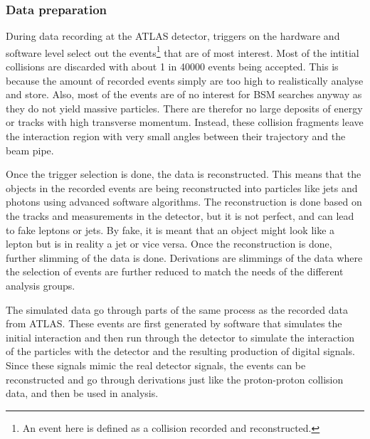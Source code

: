 \subsubsection*{Data preparation}
During data recording at the ATLAS detector, triggers on the hardware and software level select out the 
events\footnote{An event here is defined as a collision recorded and reconstructed.} that are of 
most interest. Most of the intitial collisions are discarded with about 1 in 40000 events being 
accepted. This is because the amount of recorded events simply are too 
 high to realistically analyse and store. Also, most of the events are of no interest for BSM 
 searches anyway as they do not yield massive particles. There are therefor no large deposits 
 of energy or tracks with high transverse momentum. Instead, these collision fragments leave 
 the interaction region with very small angles between their trajectory and the beam pipe. \par
 Once the trigger selection is done, the data is reconstructed. This means that the objects in 
 the recorded events are being reconstructed into particles like jets and photons using advanced 
 software algorithms. The reconstruction is done based on the tracks and measurements in the detector, 
 but it is not perfect, and can lead to fake leptons or jets. By fake, it is meant that an object 
 might look like a lepton but is in reality a jet or vice versa\cite{Gillam:2015kta}.
 Once the reconstruction is done, further slimming of the data is done. Derivations are slimmings 
 of the data where the selection of events are further reduced to match the needs of the different 
 analysis groups. \par 
 The simulated data go through parts of the same process as the recorded data from ATLAS. These 
 events are first generated by software that simulates the initial interaction and then run through 
 the detector to simulate the interaction of the particles with the detector and the resulting 
 production of digital signals. Since these signals mimic the real detector signals, the events can 
 be reconstructed and go through derivations just like the proton-proton collision data, 
and then be used in analysis. 

